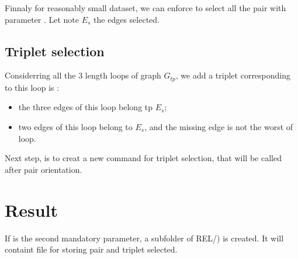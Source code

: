 \documentclass[a4paper]{article}
\begin{document}
Finnaly for reasonably small dataset, we can enforce to select all the pair with parameter .
Let note $E_s$ the edges selected.


\subsection{Triplet selection }

Considerring all the $3$ length loops of graph $G_{tp}$,  we add a triplet
corresponding to this loop is :


\begin{itemize}
   \item the three edges of this loop belong tp $E_s$;
   \item two  edges of this loop belong to $E_s$, and the missing edge
         is not the worst of loop.
\end{itemize}


Next step, is to creat a new  command for triplet selection, that will be called after pair orientation.


\section{Result}


If  is the second mandatory parameter,
a subfolder of REL/) is created.
It will  containt file for storing pair and triplet selected.
\end{document}
